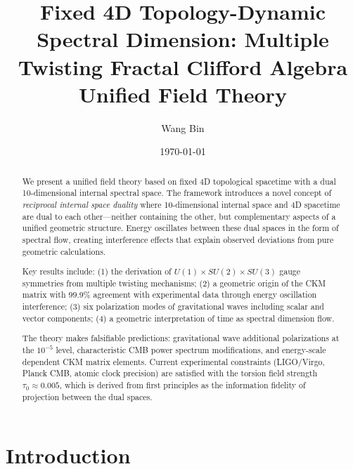 \documentclass[aps,prd,reprint,superscriptaddress,amsmath,amssymb]{revtex4-2}
\begin{document}
\title{Fixed 4D Topology-Dynamic Spectral Dimension: Multiple Twisting Fractal Clifford Algebra Unified Field Theory}

\author{Wang Bin}

\date{\today}

\begin{abstract}
We present a unified field theory based on fixed 4D topological spacetime with a dual 10-dimensional internal spectral space. The framework introduces a novel concept of \textit{reciprocal internal space duality} where 10-dimensional internal space and 4D spacetime are dual to each other---neither containing the other, but complementary aspects of a unified geometric structure. Energy oscillates between these dual spaces in the form of spectral flow, creating interference effects that explain observed deviations from pure geometric calculations.

Key results include: (1) the derivation of $U(1) \times SU(2) \times SU(3)$ gauge symmetries from multiple twisting mechanisms; (2) a geometric origin of the CKM matrix with $99.9\%$ agreement with experimental data through energy oscillation interference; (3) six polarization modes of gravitational waves including scalar and vector components; (4) a geometric interpretation of time as spectral dimension flow.

The theory makes falsifiable predictions: gravitational wave additional polarizations at the $10^{-5}$ level, characteristic CMB power spectrum modifications, and energy-scale dependent CKM matrix elements. Current experimental constraints (LIGO/Virgo, Planck CMB, atomic clock precision) are satisfied with the torsion field strength $\tau_0 \approx 0.005$, which is derived from first principles as the information fidelity of projection between the dual spaces.
\end{abstract}


\maketitle

\section{Introduction}
\label{sec:introduction}
\end{document}
